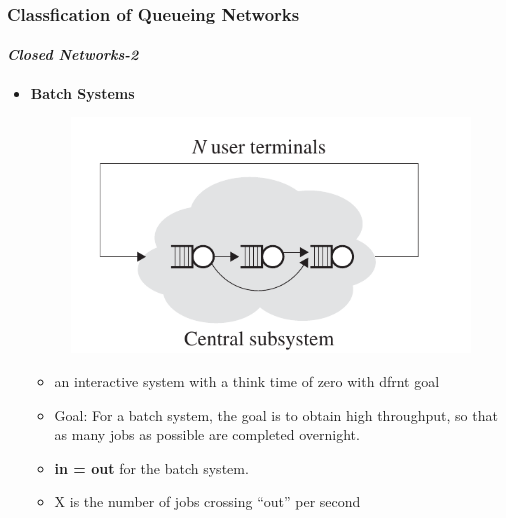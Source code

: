 \documentclass{beamer}
\begin{document}
\begin{frame}
    \frametitle{Classfication of Queueing Networks}
    \framesubtitle{\textbf{\textit{Closed Networks-2}}}
	\begin{itemize}
		\item \textbf{Batch Systems}
			\begin{figure}
        		\begin{center}
		            \includegraphics[scale=0.2]{images/closed_networks_2.jpeg}
        		\end{center}
		    \end{figure}
		    \begin{itemize}
		    \item  an interactive system with a think time of zero with dfrnt 					goal 
		    \item Goal: For a batch system, the goal is to obtain high 								throughput, so that as many jobs as possible are completed 						overnight.
		    \item \textbf{in = out} for the batch system.

		    \item  X is the number of jobs crossing “out” per second 

		    \end{itemize}
			  
	\end{itemize}	    
    
\end{frame}
\end{document}
